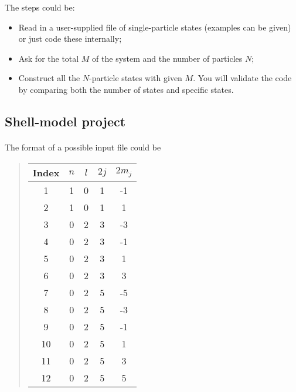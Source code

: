\documentclass[%
oneside,                 %
final,                   %
10pt]{article}
\begin{document}
The steps could be:

\begin{itemize}
\item Read in a user-supplied file of single-particle states (examples can be given) or just code these internally;

\item Ask for the total $M$ of the system and the number of particles $N$;

\item Construct all the $N$-particle states with given $M$.  You will validate the code by  comparing both the number of states and specific states.
\end{itemize}

\noindent



\subsection*{Shell-model project}

\paragraph{}
The format of a possible input  file could be

\begin{quote}
\begin{tabular}{ccccc}
\hline
\multicolumn{1}{c}{ Index } & \multicolumn{1}{c}{ $n$ } & \multicolumn{1}{c}{ $l$ } & \multicolumn{1}{c}{ $2j$ } & \multicolumn{1}{c}{ $2m_j$ } \\
\hline
1     & 1   & 0   & 1    & -1     \\
2     & 1   & 0   & 1    & 1      \\
3     & 0   & 2   & 3    & -3     \\
4     & 0   & 2   & 3    & -1     \\
5     & 0   & 2   & 3    & 1      \\
6     & 0   & 2   & 3    & 3      \\
7     & 0   & 2   & 5    & -5     \\
8     & 0   & 2   & 5    & -3     \\
9     & 0   & 2   & 5    & -1     \\
10    & 0   & 2   & 5    & 1      \\
11    & 0   & 2   & 5    & 3      \\
12    & 0   & 2   & 5    & 5      \\
\hline
\end{tabular}
\end{quote}
\end{document}

